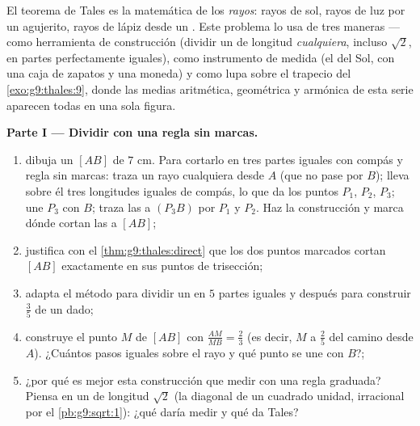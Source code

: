 \begin{problem}
\label{pb:g9:thales:1}
El teorema de Tales es la matemática de los \emph{rayos}: rayos de sol,
rayos de luz por un agujerito, rayos de lápiz desde un . Este
problema lo usa de tres maneras --- como herramienta de construcción (dividir un
 de longitud \emph{cualquiera}, incluso $\sqrt2$, en partes perfectamente
iguales), como instrumento de medida (el  del Sol, con
una caja de zapatos y una moneda) y como lupa sobre el trapecio
del \cref{exo:g9:thales:9}, donde las medias aritmética, geométrica y
armónica de esta serie aparecen todas en una sola figura.

\medskip
\noindent\textbf{Parte I --- Dividir con una regla sin marcas.}
\begin{enumerate}
  \item dibuja un  $[AB]$ de $7$ cm. Para cortarlo en tres
        partes iguales con compás y regla sin marcas: traza un rayo cualquiera
        desde $A$ (que no pase por $B$); lleva sobre él tres longitudes
        iguales de compás, lo que da los puntos $P_1$, $P_2$, $P_3$; une
        $P_3$ con $B$; traza las  a $(P_3 B)$ por
        $P_1$ y $P_2$. Haz la construcción y marca dónde
        cortan las  a $[AB]$;
  \item justifica con el \cref{thm:g9:thales:direct} que los dos
        puntos marcados cortan $[AB]$ exactamente en sus puntos de trisección;
  \item adapta el método para dividir un  en $5$ partes
        iguales y después para construir $\frac35$ de un  dado;
  \item construye el punto $M$ de $[AB]$ con
        $\frac{AM}{MB} = \frac23$ (es decir, $M$ a $\frac25$ del
        camino desde $A$). ¿Cuántos pasos iguales sobre el rayo y
        qué punto se une con $B$?;
  \item ¿por qué es mejor esta construcción que medir con una
        regla graduada? Piensa en un  de longitud $\sqrt2$
        (la diagonal de un cuadrado unidad, irracional por el
        \cref{pb:g9:sqrt:1}): ¿qué daría medir y
        qué da Tales?
\end{enumerate}


\end{problem}

